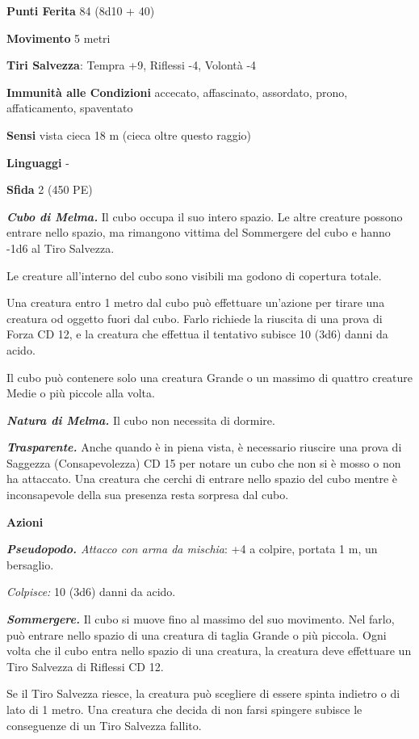 \begin{multicols}{2}
\textbf{Punti Ferita} 84 (8d10 + 40)

\textbf{Movimento} 5 metri

\textbf{Tiri Salvezza}: Tempra +9, Riflessi -4, Volontà -4

\textbf{Immunità alle Condizioni} accecato, affascinato, assordato, prono, affaticamento, spaventato

\textbf{Sensi} vista cieca 18 m (cieca oltre questo raggio)

\textbf{Linguaggi} -

\textbf{Sfida} 2 (450 PE)

\emph{\textbf{Cubo di Melma.}} Il cubo occupa il suo intero spazio. Le altre creature possono entrare nello spazio, ma rimangono vittima del Sommergere del cubo e hanno -1d6 al Tiro Salvezza.

Le creature all'interno del cubo sono visibili ma godono di copertura totale.

Una creatura entro 1 metro dal cubo può effettuare un'azione per tirare una creatura od oggetto fuori dal cubo. Farlo richiede la riuscita di una prova di Forza CD 12, e la creatura che effettua il tentativo subisce 10 (3d6) danni da acido.

Il cubo può contenere solo una creatura Grande o un massimo di quattro creature Medie o più piccole alla volta.

\emph{\textbf{Natura di Melma.}} Il cubo non necessita di dormire.

\emph{\textbf{Trasparente.}} Anche quando è in piena vista, è necessario riuscire una prova di Saggezza (Consapevolezza) CD 15 per notare un cubo che non si è mosso o non ha attaccato. Una creatura che cerchi di entrare nello spazio del cubo mentre è inconsapevole della sua presenza resta sorpresa dal cubo.

\textbf{Azioni}

\emph{\textbf{Pseudopodo.} Attacco con arma da mischia}: +4 a colpire, portata 1 m, un bersaglio.

\emph{Colpisce:} 10 (3d6) danni da acido.

\emph{\textbf{Sommergere.}} Il cubo si muove fino al massimo del suo movimento. Nel farlo, può entrare nello spazio di una creatura di taglia Grande o più piccola. Ogni volta che il cubo entra nello spazio di una creatura, la creatura deve effettuare un Tiro Salvezza di Riflessi CD 12.

Se il Tiro Salvezza riesce, la creatura può scegliere di essere spinta indietro o di lato di 1 metro. Una creatura che decida di non farsi spingere subisce le conseguenze di un Tiro Salvezza fallito.


\end{multicols}
